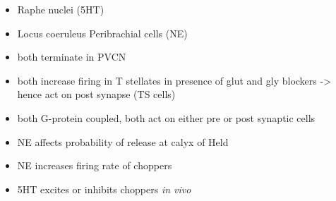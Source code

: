 \begin{itemize}
\item Raphe nuclei (5HT)
\item Locus coeruleus Peribrachial cells (NE)
\item both terminate in PVCN \citep{KlepperHerbert:1991,Thompson:2003,ThompsonLauder:2005,Thompson:2003a,ThompsonWiechmann:2002,BehrensSchofieldEtAl:2002,ThompsonThompson:2001,ThompsonThompson:2001a,ThompsonMooreEtAl:1995,ThompsonThompsonEtAl:1994}
\item both increase firing in T stellates \citep{OertelWrightEtAl:2010} in presence of glut and gly blockers -> hence act on post synapse (TS cells)
\item both G-protein coupled, both act on either pre or post synaptic cells
\item NE affects probability of release at calyx of Held
\item NE increases firing rate of choppers \citep{KosslVater:1989,Ebert:1996}
\item 5HT excites or inhibits choppers \emph{in vivo} \citep{EbertOstwald:1992}
\end{itemize}



